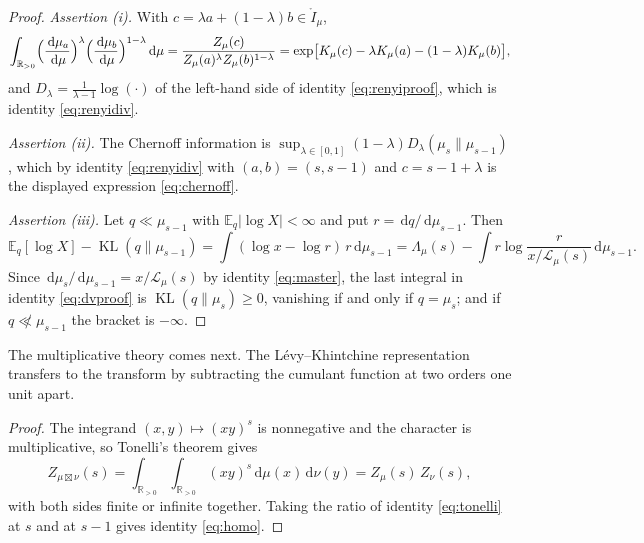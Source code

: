 \documentclass[sn-mathphys-num]{sn-jnl}
\theoremstyle{thmstyleone}%
\theoremstyle{thmstyletwo}%
\theoremstyle{thmstylethree}%
\theoremstyle{thmstyleone}%
\providecommand{\E}{\mathbb{E}}
\providecommand{\KL}{\operatorname{KL}}
\providecommand{\Rpos}{\mathbb{R}_{>0}}
\providecommand{\Leh}{\mathscr{L}}
\providecommand{\dd}{\,\mathrm{d}}
\begin{document}
\begin{appendices}
		
		\proprenyidiv*
		
		\begin{proof}
			\emph{Assertion (i).} With
			$c=\lambda a+(1-\lambda)b\in\mathring I_\mu$,
			\begin{equation}\label{eq:renyiproof}
				\int_{\Rpos}\Bigl(\frac{\dd\mu_a}{\dd\mu}\Bigr)^{\lambda}
				\Bigl(\frac{\dd\mu_b}{\dd\mu}\Bigr)^{1-\lambda}\dd\mu
				=\frac{Z_\mu(c)}{Z_\mu(a)^{\lambda}Z_\mu(b)^{1-\lambda}}
				=\exp\bigl[K_\mu(c)-\lambda K_\mu(a)
				-(1-\lambda)K_\mu(b)\bigr],
			\end{equation}
			and $D_\lambda=\frac{1}{\lambda-1}\log(\cdot)$ of the left-hand
			side of identity \eqref{eq:renyiproof}, which is identity
			\eqref{eq:renyidiv}.
			
			\emph{Assertion (ii).} The Chernoff information is
			$\sup_{\lambda\in[0,1]}(1-\lambda)D_\lambda(\mu_s\|\mu_{s-1})$,
			which by identity \eqref{eq:renyidiv} with $(a,b)=(s,s-1)$ and
			$c=s-1+\lambda$ is the displayed expression
			\eqref{eq:chernoff}.
			
			\emph{Assertion (iii).} Let $q\ll\mu_{s-1}$ with
			$\E_q|\log X|<\infty$ and put $r=\dd q/\dd\mu_{s-1}$. Then
			\begin{equation}\label{eq:dvproof}
				\E_q[\log X]-\KL(q\|\mu_{s-1})
				=\int(\log x-\log r)\,r\dd\mu_{s-1}
				=\Lambda_\mu(s)-\int r\log\frac{r}{x/\Leh_\mu(s)}
				\dd\mu_{s-1}.
			\end{equation}
			Since $\dd\mu_s/\dd\mu_{s-1}=x/\Leh_\mu(s)$ by identity
			\eqref{eq:master}, the last integral in identity \eqref{eq:dvproof} is
			$\KL(q\|\mu_s)\ge0$, vanishing if and only if $q=\mu_s$; and if
			$q\not\ll\mu_{s-1}$ the bracket is $-\infty$.
		\end{proof}
		
		The multiplicative theory comes next. The L\'evy--Khintchine
		representation transfers to the transform by subtracting the
		cumulant function at two orders one unit apart.
		\thmcharacter*
		
		\begin{proof}
			The integrand $(x,y)\mapsto(xy)^{s}$ is nonnegative and the
			character is multiplicative, so Tonelli's theorem gives
			\begin{equation}\label{eq:tonelli}
				Z_{\mu\boxtimes\nu}(s)
				=\int_{\Rpos}\!\!\int_{\Rpos}(xy)^{s}\dd\mu(x)\dd\nu(y)
				=Z_\mu(s)\,Z_\nu(s),
			\end{equation}
			with both sides finite or infinite together. Taking the ratio of
			identity \eqref{eq:tonelli} at $s$ and at $s-1$ gives identity
			\eqref{eq:homo}.
		\end{proof}
		

\end{appendices}
\end{document}
